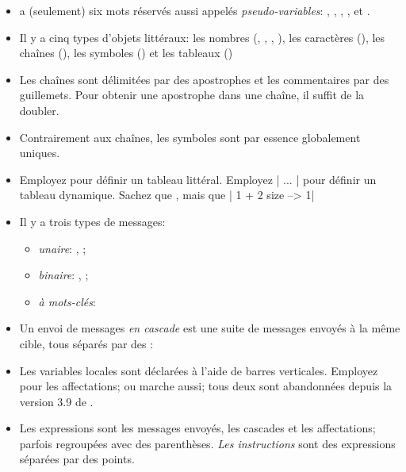 \documentclass[a4paper,10pt,twoside]{book}
\begin{document}
\begin{itemize}

\item	\sq a (seulement) six mots r\'{e}serv\'{e}s aussi appel\'{e}s
  \textit{pseudo-variables}: , , ,
  ,  et  .

\item	Il y a cinq types d'objets litt\'{e}raux: les nombres (,
  , \mbox{,} ), les caract\`{e}res (), les chaînes (), les symboles () et les tableaux ()

\item	Les chaînes sont d\'{e}limit\'{e}es par des apostrophes et les commentaires par des guillemets. Pour obtenir une apostrophe dans une chaîne, il suffit de la doubler.

\item	Contrairement aux chaînes, les symboles sont par essence globalement uniques.

\item	Employez  pour d\'{e}finir un tableau litt\'{e}ral.
		Employez \ct|{ ... }| pour d\'{e}finir un tableau dynamique.
		Sachez que
		, mais que 
		\ct|{ 1 + 2 } size --> 1|

\item	Il y a trois types de messages:
  \begin{itemize}
\item \emph{unaire}: \eg {}, ;
\item 		\emph{binaire}: \eg {}, ;
\item 		\emph{\`{a} mots-cl\'{e}s}: \eg {}%
      \end{itemize}
\item	Un envoi de messages \emph{en cascade}  est une suite de messages envoy\'{e}s \`{a} la m\^{e}me cible, tous s\'{e}par\'{e}s par des \ct{;}:

\item	Les variables locales sont d\'{e}clar\'{e}es à l'aide de barres verticales.
		Employez \ct{:=} pour les affectations; \ct{_} ou
         marche aussi; tous deux sont abandonnées depuis la version 3.9 de \sq.

\item	Les expressions sont les messages envoy\'{e}s, les cascades et
  les affectations; parfois regroup\'{e}es avec des parenth\`{e}ses.
		\emph{Les instructions} sont des expressions s\'{e}par\'{e}es par des points.


\end{itemize}
\end{document}
